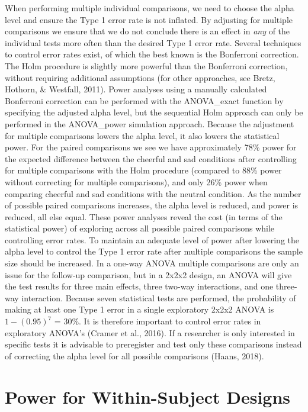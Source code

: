 \documentclass[
  ,jou,floatsintext]{apa6}
\begin{document}
When performing multiple individual comparisons, we need to choose the alpha level and ensure the Type 1 error rate is not inflated.
By adjusting for multiple comparisons we ensure that we do not conclude there is an effect in \emph{any} of the individual tests more often than the desired Type 1 error rate.
Several techniques to control error rates exist, of which the best known is the Bonferroni correction.
The Holm procedure is slightly more powerful than the Bonferroni correction, without requiring additional assumptions (for other approaches, see Bretz, Hothorn, \& Westfall, 2011).
Power analyses using a manually calculated Bonferroni correction can be performed with the ANOVA\_exact function by specifying the adjusted alpha level, but the sequential Holm approach can only be performed in the ANOVA\_power simulation approach.
Because the adjustment for multiple comparisons lowers the alpha level, it also lowers the statistical power.
For the paired comparisons we see we have approximately 78\% power for the expected difference between the cheerful and sad conditions after controlling for multiple comparisons with the Holm procedure (compared to 88\% power without correcting for multiple comparisons), and only 26\% power when comparing cheerful and sad conditions with the neutral condition.
As the number of possible paired comparisons increases, the alpha level is reduced, and power is reduced, all else equal.
These power analyses reveal the cost (in terms of the statistical power) of exploring across all possible paired comparisons while controlling error rates.
To maintain an adequate level of power after lowering the alpha level to control the Type 1 error rate after multiple comparisons the sample size should be increased.
In a one-way ANOVA multiple comparisons are only an issue for the follow-up comparison, but in a 2x2x2 design, an ANOVA will give the test results for three main effects, three two-way interactions, and one three-way interaction.
Because seven statistical tests are performed, the probability of making at least one Type 1 error in a single exploratory 2x2x2 ANOVA is \(1-(0.95)^7\) = 30\%.
It is therefore important to control error rates in exploratory ANOVA's (Cramer et al., 2016).
If a researcher is only interested in specific tests it is advisable to preregister and test only these comparisons instead of correcting the alpha level for all possible comparisons (Haans, 2018).

\hypertarget{power-for-within-subject-designs}{%
\section{Power for Within-Subject Designs}\label{power-for-within-subject-designs}}
\end{document}
